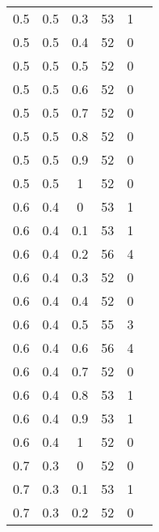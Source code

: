 \begin{table}[ht]
\begin{minipage}[!h]{0.50\hsize}
\begin{center}
{\begin{tabular}{|c@{\hspace{5mm}}|c@{\hspace{5mm}}|c@{\hspace{5mm}}|c@{\hspace{5mm}}|c@{\hspace{5mm}}|c|}
                    0.5  & 0.5  & 0.3  & 53    & 1     \\
                    0.5  & 0.5  & 0.4  & 52    & 0     \\
                    0.5  & 0.5  & 0.5  & 52    & 0     \\
                    0.5  & 0.5  & 0.6  & 52    & 0     \\
                    0.5  & 0.5  & 0.7  & 52    & 0     \\
                    0.5  & 0.5  & 0.8  & 52    & 0     \\
                    0.5  & 0.5  & 0.9  & 52    & 0     \\
                    0.5  & 0.5  & 1    & 52    & 0     \\
                    0.6  & 0.4  & 0    & 53    & 1     \\
                    0.6  & 0.4  & 0.1  & 53    & 1     \\
                    0.6  & 0.4  & 0.2  & 56    & 4     \\
                    0.6  & 0.4  & 0.3  & 52    & 0     \\
                    0.6  & 0.4  & 0.4  & 52    & 0     \\
                    0.6  & 0.4  & 0.5  & 55    & 3     \\
                    0.6  & 0.4  & 0.6  & 56    & 4     \\
                    0.6  & 0.4  & 0.7  & 52    & 0     \\
                    0.6  & 0.4  & 0.8  & 53    & 1     \\
                    0.6  & 0.4  & 0.9  & 53    & 1     \\
                    0.6  & 0.4  & 1    & 52    & 0     \\
                    0.7  & 0.3  & 0    & 52    & 0     \\
                    0.7  & 0.3  & 0.1  & 53    & 1     \\
                    0.7  & 0.3  & 0.2  & 52    & 0     \\
                    \hline
                \end{tabular}}
        \end{center}
    \end{minipage}
\end{table}
\clearpage
